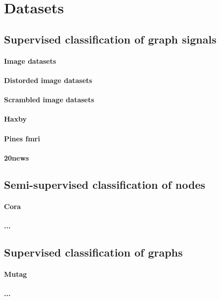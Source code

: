 \section{Datasets}

\subsection{Supervised classification of graph signals}

\paragraph{Image datasets}

\paragraph{Distorded image datasets}

\paragraph{Scrambled image datasets}

\paragraph{Haxby}

\paragraph{Pines fmri}

\paragraph{20news}

\subsection{Semi-supervised classification of nodes}

\paragraph{Cora}

\paragraph{...}

\subsection{Supervised classification of graphs}

\paragraph{Mutag}

\paragraph{...}


